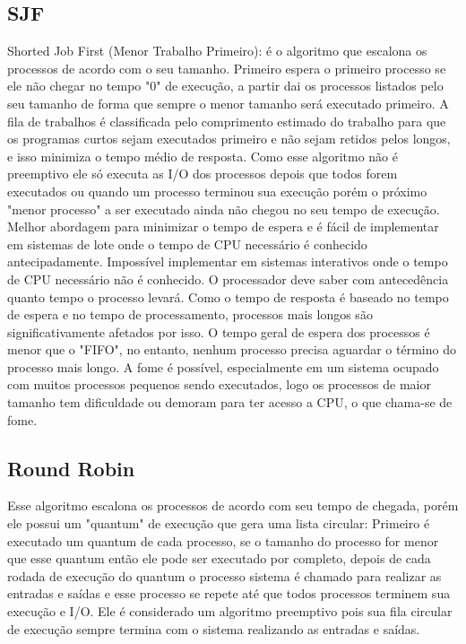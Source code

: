 \documentclass[times, 10pt,twocolumn]{article}
\begin{document}
\subsection{SJF} 
Shorted Job First (Menor Trabalho Primeiro): é o algoritmo que escalona os processos de acordo com o seu tamanho. Primeiro espera o primeiro processo se ele não chegar no tempo "0" de execução, a partir dai os processos listados pelo seu tamanho de forma que sempre o menor tamanho será executado primeiro. A fila de trabalhos é classificada pelo comprimento estimado do trabalho para que os programas curtos sejam executados primeiro e não sejam retidos pelos longos, e isso minimiza o tempo médio de resposta. Como esse algoritmo não é preemptivo ele só executa as I/O dos processos depois que todos forem executados ou quando um processo terminou sua execução porém o próximo "menor processo" a ser executado ainda não chegou no seu tempo de execução. Melhor abordagem para minimizar o tempo de espera e é fácil de implementar em sistemas de lote onde o tempo de CPU necessário é conhecido antecipadamente.
Impossível implementar em sistemas interativos onde o tempo de CPU necessário não é conhecido. O processador deve saber com antecedência quanto tempo o processo levará. \cite{tutorialspoint}
Como o tempo de resposta é baseado no tempo de espera e no tempo de processamento, processos mais longos são significativamente afetados por isso. O tempo geral de espera dos processos é menor que o "FIFO", no entanto, nenhum processo precisa aguardar o término do processo mais longo.
A fome é possível, especialmente em um sistema ocupado com muitos processos pequenos sendo executados, logo os processos de maior tamanho tem dificuldade ou demoram para ter acesso a CPU, o que chama-se de fome. \cite{rutgers}

\subsection{Round Robin} 
Esse algoritmo escalona os processos de acordo com seu tempo de chegada, porém ele possui um "quantum" de execução que gera uma lista circular: Primeiro é executado um quantum de cada processo, se o tamanho do processo for menor que esse quantum então ele pode ser executado por completo, depois de cada rodada de execução do quantum o processo sistema é chamado para realizar as entradas e saídas e esse processo se repete até que todos processos terminem sua execução e I/O. Ele é considerado um algoritmo preemptivo pois sua fila circular de execução sempre termina com o sistema realizando as entradas e saídas. \cite{rutgers} 
\end{document}
